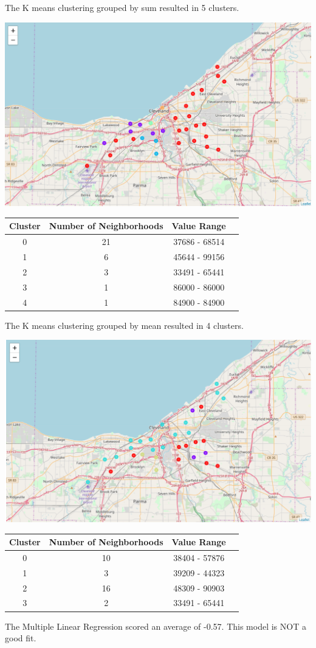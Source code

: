 \documentclass[twoside,14pt]{report}
\begin{document}
The K means clustering grouped by sum resulted in 5 clusters.

\begin{center}
    \includegraphics[scale=.5]{Images/CleSum.png}


\begin{tabular}{c|c|c|c}
Cluster & Number of Neighborhoods & Value Range\\ \hline
0 & 21 & 37686 - 68514\\
1 & 6 & 45644 - 99156 \\
2 & 3 & 33491 - 65441\\
3 & 1 & 86000 - 86000 \\
4&1&84900 - 84900\\
\end{tabular}
\end{center}

\newpage
The K means clustering grouped by mean resulted in 4 clusters.
\begin{center}
  \includegraphics[scale=.5]{Images/CleMean.png}  

\begin{tabular}{c|c|c|c}
Cluster & Number of Neighborhoods & Value Range\\ \hline
0 & 10 & 38404 - 57876\\
1 & 3 & 39209 - 44323 \\
2 & 16 & 48309 - 90903 \\
3 & 2 & 33491 - 65441 \\
\end{tabular}
\end{center}
The Multiple Linear Regression scored an average of -0.57.  This model is NOT a good fit. 
\end{document}
